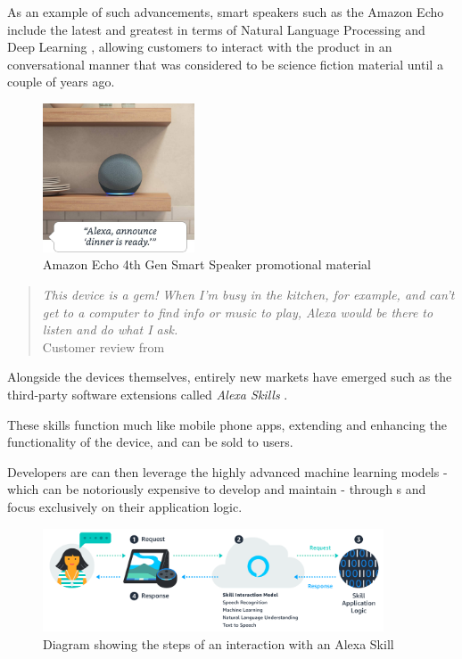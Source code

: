 \documentclass[openright]{normas-utf-tex} %
\begin{document}
As an example of such advancements, smart speakers such as the Amazon Echo \cite{GaoPanWangChen2018} include the latest and greatest
in terms of Natural Language Processing and Deep Learning \cite{Young2018}, allowing customers to interact with the product in an conversational manner
that was considered to be science fiction material until a couple of years ago.

\begin{figure}[!htb]
	\centering
	\includegraphics[width=0.4\textwidth]{./images/echodot4.jpg} %
	\caption[Amazon Echo 4th Generation smart speaker promotional material]{Amazon Echo 4th Gen Smart Speaker promotional material}
	\label{fig:echodot4}
\end{figure}

\begin{quote}
    \textit{This device is a gem! When I’m busy in the kitchen, for example, and can’t get
    to a computer to find info or music to play, Alexa would be there to listen
    and do what I ask.} \\
    Customer review from \cite{GaoPanWangChen2018}
\end{quote}

Alongside the devices themselves, entirely new markets have emerged such as the third-party software extensions
called \textit{Alexa Skills} \cite{Alexa2022}.

These skills function much like mobile phone apps, extending and enhancing the functionality of the device, and
can be sold to users.

Developers are can then leverage the highly advanced machine learning models - which can be notoriously expensive to develop 
and maintain \cite{Phdata2021} - through s and focus exclusively on their application logic.

\begin{figure}[htb!]
	\centering
	\includegraphics[width=0.9\textwidth]{./images/skills.png} %
	\caption[Diagram showing the steps of an interaction with an Alexa Skill]{Diagram showing the steps of an interaction with an Alexa Skill}
	\label{fig:alexaskill}
\end{figure}
\end{document}
